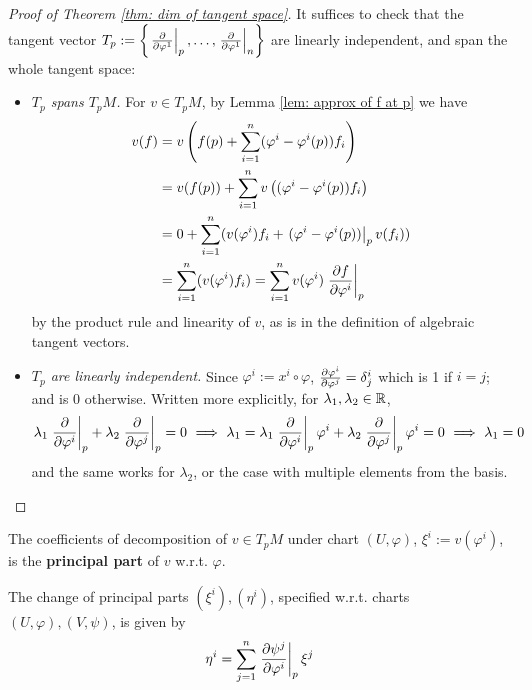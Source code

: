 \documentclass{article}
\begin{document}
\begin{proof}[Proof of Theorem \ref{thm: dim of tangent space}]
    It suffices to check that the tangent vector $T_p := \left\{ \left.\frac{\partial }{\partial \varphi^1}\right|_{p}, \dots, \left.\frac{\partial }{\partial \varphi^1}\right|_{n} \right\}$ are linearly independent, and span the whole tangent space:
    \begin{itemize}
        \item \emph{$T_p$ spans $T_p M$.} For $v \in T_pM$, by Lemma \ref{lem: approx of f at p} we have
        \begin{align*}
            v(f)
            & = v\left( f(p) + \sum_{i = 1}^{n} (\varphi^i - \varphi^i(p)) f_i \right) \\
            & = v(f(p)) + \sum_{i = 1}^{n} v \left( (\varphi^i - \varphi^i(p)) f_i \right) \\
            & = 0 + \sum_{i = 1}^{n} (v(\varphi^i) f_i + \left.(\varphi^i - \varphi^i(p))\right|_{p} v(f_i)) \\
            & = \sum_{i = 1}^{n} (v(\varphi^i) f_i) = \sum_{i = 1}^{n} v(\varphi^i) \left.\frac{\partial f}{\partial \varphi^i}\right|_{p}
        \end{align*}
        by the product rule and linearity of $v$, as is in the definition of algebraic tangent vectors.
        \item \emph{$T_p$ are linearly independent.} Since $\varphi^i := x^i \circ \varphi$, $\frac{\partial \varphi^i}{\partial \varphi^j} = \delta_j^i$ which is 1 if $i = j$; and is 0 otherwise. Written more explicitly, for $\lambda_1, \lambda_2 \in \mathbb{R}$,
        \[
            \lambda_1 \left.\frac{\partial }{\partial \varphi^i}\right|_{p} + \lambda_2 \left.\frac{\partial }{\partial \varphi^j}\right|_{p} = 0 \ \Longrightarrow\  
            \lambda_1 = \lambda_1 \left.\frac{\partial }{\partial \varphi^i}\right|_{p} \varphi^i + \lambda_2 \left.\frac{\partial }{\partial \varphi^j}\right|_{p} \varphi^i = 0 \ \Longrightarrow\  \lambda_1 = 0
        \]
        and the same works for $\lambda_2$, or the case with multiple elements from the basis.
    \end{itemize}
\end{proof}

\begin{definition}
    The coefficients of decomposition of $v \in T_pM$ under chart $(U, \varphi)$, $\xi^i := v(\varphi^i)$, is the \textbf{principal part} of $v$ w.r.t. $\varphi$.
\end{definition}

\begin{corollary}
    The change of principal parts $(\xi^i), (\eta^i)$, specified w.r.t. charts $(U, \varphi), (V, \psi)$, is given by
    \[
        \eta^i = \sum_{j = 1}^{n} \left.\frac{\partial \psi^j}{\partial \varphi^i}\right|_{p} \xi^j
    \]
\end{corollary}
\end{document}
